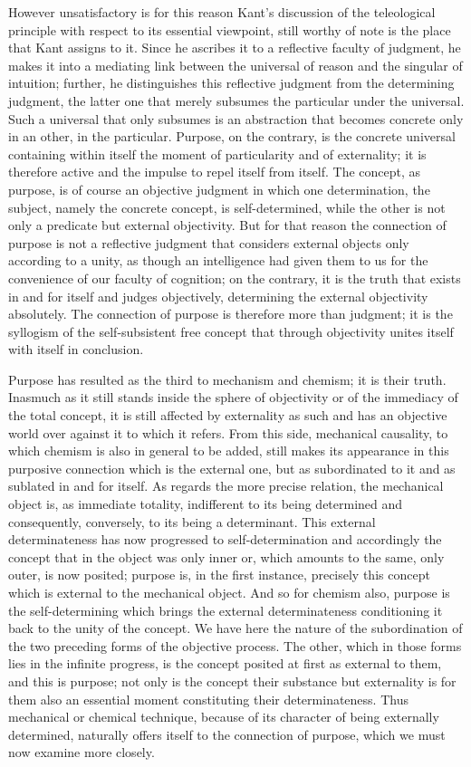 However unsatisfactory is for this reason Kant's discussion
of the teleological principle with respect to its essential viewpoint,
still worthy of note is the place that Kant assigns to it.
Since he ascribes it to a reflective faculty of judgment,
he makes it into a mediating link between
the universal of reason and the singular of intuition;
further, he distinguishes this reflective judgment
from the determining judgment, the latter one
that merely subsumes the particular under the universal.
Such a universal that only subsumes is an abstraction
that becomes concrete only in an other, in the particular.
Purpose, on the contrary, is the concrete universal
containing within itself the moment
of particularity and of externality;
it is therefore active and the impulse
to repel itself from itself.
The concept, as purpose, is of course an objective judgment
in which one determination, the subject,
namely the concrete concept, is self-determined,
while the other is not only a predicate but external objectivity.
But for that reason the connection of purpose is not
a reflective judgment that considers external objects
only according to a unity,
as though an intelligence had given them to us
for the convenience of our faculty of cognition;
on the contrary, it is the truth that exists in
and for itself and judges objectively,
determining the external objectivity absolutely.
The connection of purpose is therefore more than judgment;
it is the syllogism of the self-subsistent free concept
that through objectivity unites itself with itself in conclusion.

Purpose has resulted as the third
to mechanism and chemism;
it is their truth.
Inasmuch as it still stands
inside the sphere of objectivity
or of the immediacy of the total concept,
it is still affected by externality as such
and has an objective world over
against it to which it refers.
From this side, mechanical causality,
to which chemism is also in general to be added,
still makes its appearance in this purposive connection
which is the external one,
but as subordinated to it
and as sublated in and for itself.
As regards the more precise relation,
the mechanical object is, as immediate totality,
indifferent to its being determined and consequently,
conversely, to its being a determinant.
This external determinateness has now
progressed to self-determination
and accordingly the concept that
in the object was only inner
or, which amounts to the same,
only outer, is now posited;
purpose is, in the first instance,
precisely this concept which is
external to the mechanical object.
And so for chemism also, purpose is the self-determining
which brings the external determinateness conditioning it
back to the unity of the concept.
We have here the nature of the subordination of
the two preceding forms of the objective process.
The other, which in those forms lies in the infinite progress,
is the concept posited at first as external to them,
and this is purpose;
not only is the concept their substance
but externality is for them also
an essential moment constituting their determinateness.
Thus mechanical or chemical technique,
because of its character of being externally determined,
naturally offers itself to the connection of purpose,
which we must now examine more closely.
